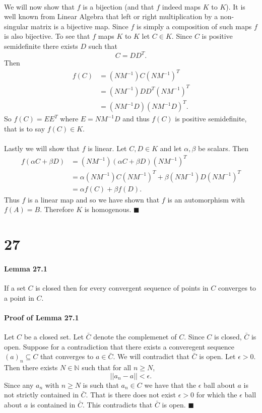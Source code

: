 \documentclass[letterpaper,12pt,oneside,onecolumn]{article}
\newcommand{\N}{\mathbb{N}} \newcommand{\R}{\mathbb{R}}
\begin{document}
\paragraph{}
We will now show that $f$ is a bijection (and that $f$ indeed maps $K$ to $K$). It is well known from Linear Algebra that left or right multiplication by a non-singular matrix is a bijective map. Since $f$ is simply a composition of such maps $f$ is also bijective. To see that $f$ maps $K$ to $K$ let $C \in K$. Since $C$ is positive semidefinite there exists $D$ such that$$C = DD^T.$$ Then 
\begin{align*}
f(C) &= (NM^{-1})C(NM^{-1})^T \\
&= (NM^{-1})DD^T(NM^{-1})^T  \\
&= (NM^{-1}D)(NM^{-1}D)^T.
\end{align*}
So $f(C) = EE^T$ where $E = NM^{-1}D$ and thus $f(C)$ is positive semidefinite, that is to say $f(C) \in K$.
\paragraph{}
Lastly we will show that $f$ is linear. Let $C, D \in K$ and let $\alpha, \beta$ be scalars. Then
\begin{align*}
f(\alpha C + \beta D) &= (NM^{-1})(\alpha C + \beta D)(NM^{-1})^T \\
&= \alpha (NM^{-1}) C (NM^{-1})^T + \beta (NM^{-1})D(NM^{-1})^T \\
&= \alpha f(C) + \beta f(D).
\end{align*}
Thus $f$ is a linear map and so we have shown that $f$ is an automorphism with $f(A) = B$. Therefore $K$ is homogenous. $\blacksquare$
\section*{27}
\paragraph{Lemma 27.1}
If a set $C$ is closed then for every convergent sequence of points in $C$ converges to a point in $C$.
\paragraph{Proof of Lemma 27.1}
Let $C$ be a closed set. Let $\bar{C}$ denote the complemenet of $C$. Since $C$ is closed, $\bar{C}$ is open. Suppose for a contradiction that there exists a converegent sequence $(a)_n \subseteq C$ that converges to $a \in \bar{C}$. We will contradict that $\bar{C}$ is open. Let $\epsilon > 0$. Then there exists $N \in \N$ such that for all $n \geq N$, $$||a_n - a|| < \epsilon.$$
Since any $a_n$ with $n \geq N$ is such that $a_n \in C$ we have that the $\epsilon$ ball about $a$ is not strictly contained in $\bar{C}$. That is there does not exist $\epsilon > 0$ for which the $\epsilon$ ball about $a$ is contained in $\bar{C}$. This contradicts that $\bar{C}$ is open. $\blacksquare$
\end{document}
